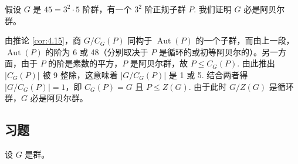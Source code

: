 \begin{example}
假设 \(G\) 是 \(45 = 3^2 \cdot 5\) 阶群，有一个 \(3^2\) 阶正规子群 \(P\). 我们证明 \(G\) 必是阿贝尔群。

由推论 \ref{cor:4.15}，商 \(G/C_G(P)\) 同构于 \(\operatorname{Aut}(P)\) 的一个子群，而由上一段，\(\operatorname{Aut}(P)\) 的阶为 6 或 48（分别取决于 \(P\) 是循环的或初等阿贝尔的）。另一方面，由于 \(P\) 的阶是素数的平方，\(P\) 是阿贝尔群，故 \(P \leq C_G(P)\). 由此推出 \(|C_G(P)|\) 被 9 整除，这意味着 \(|G/C_G(P)|\) 是 1 或 5. 结合两者得 \(|G/C_G(P)| = 1\)，即 \(C_G(P) = G\) 且 \(P \leq Z(G)\). 由于此时 \(G/Z(G)\) 是循环群，\(G\) 必是阿贝尔群。
\end{example}

\subsection*{习题}
设 \(G\) 是群。

